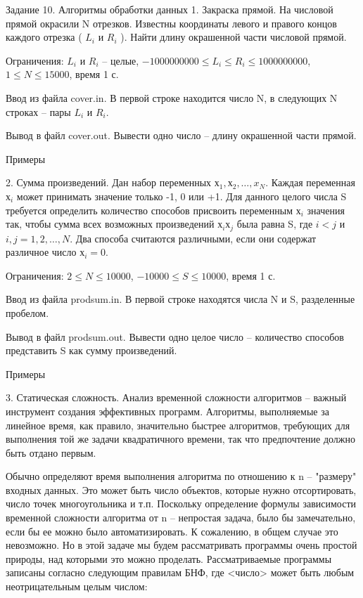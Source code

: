 \documentclass[]{article}
\begin{document}
Задание 10. Алгоритмы обработки данных
1. Закраска прямой. На числовой прямой окрасили N отрезков. Известны координаты левого и правого концов каждого отрезка ( $L_i$ и $R_i$ ). Найти длину окрашенной части числовой прямой.

Ограничения: $L_i$ и $R_i$ – целые, $-1 000 000 000 \leq L_i \leq R_i \leq 1 000 000 000$, $1 \leq N \leq 15 000$, время 1 с.

Ввод из файла cover.in. В первой строке находится число N, в следующих N строках – пары $L_i$ и $R_i$.

Вывод в файл cover.out. Вывести одно число – длину окрашенной части прямой.

Примеры



2. Сумма произведений. Дан набор переменных $х_1, х_2, \ldots , x_N$. Каждая переменная $х_i$ может принимать значение только -1, 0 или +1. Для данного целого числа S требуется определить количество способов присвоить переменным $х_i$ значения так, чтобы сумма всех возможных произведений $х_i х_j$ была равна S, где $i < j$ и $i, j = 1, 2, \ldots, N$. Два способа считаются различными, если они содержат различное число $х_i = 0$.

Ограничения: $2 \leq N \leq 10 000$, $-10 000 \leq S \leq 10 000$, время 1 с.

Ввод из файла prodsum.in. В первой строке находятся числа N и S, разделенные пробелом.

Вывод в файл prodsum.out. Вывести одно целое число – количество способов представить S как сумму произведений.

Примеры



3. Статическая сложность. Анализ временной сложности алгоритмов – важный инструмент создания эффективных программ. Алгоритмы, выполняемые за линейное время, как правило, значительно быстрее алгоритмов, требующих для выполнения той же задачи квадратичного времени, так что предпочтение должно быть отдано первым.

Обычно определяют время выполнения алгоритма по отношению к n – "размеру" входных данных. Это может быть число объектов, которые нужно отсортировать, число точек многоугольника и т.п. Поскольку определение формулы зависимости временной сложности алгоритма от n – непростая задача, было бы замечательно, если бы ее можно было автоматизировать. К сожалению, в общем случае это невозможно. Но в этой задаче мы будем рассматривать программы очень простой природы, над которыми это можно проделать. Рассматриваемые программы записаны согласно следующим правилам БНФ, где <число> может быть любым неотрицательным целым числом:
\end{document}
